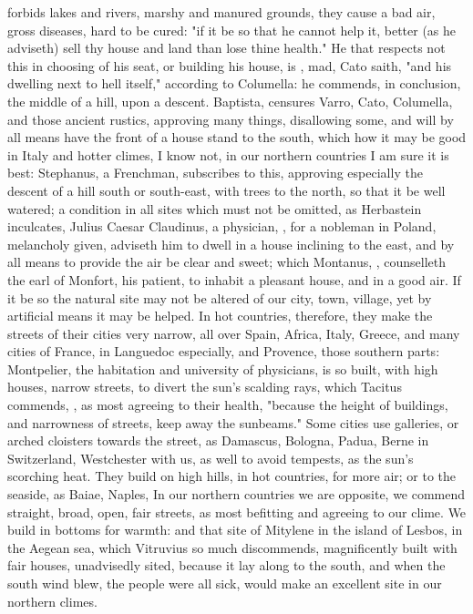 { forbids lakes and rivers, marshy and manured grounds, they cause a bad air, gross diseases, hard to be cured: "if it be so that he cannot help it, better (as he adviseth) sell thy house and land than lose thine health." He that respects not this in choosing of his seat, or building his house, is , mad, Cato saith, "and his dwelling next to hell itself," according to Columella: he commends, in conclusion, the middle of a hill, upon a descent. Baptista,  censures Varro, Cato, Columella, and those ancient rustics, approving many things, disallowing some, and will by all means have the front of a house stand to the south, which how it may be good in Italy and hotter climes, I know not, in our northern countries I am sure it is best: Stephanus, a Frenchman,  subscribes to this, approving especially the descent of a hill south or south-east, with trees to the north, so that it be well watered; a condition in all sites which must not be omitted, as Herbastein inculcates,  Julius Caesar Claudinus, a physician, , for a nobleman in Poland, melancholy given, adviseth him to dwell in a house inclining to the east, and by all means to provide the air be clear and sweet; which Montanus, , counselleth the earl of Monfort, his patient, to inhabit a pleasant house, and in a good air. If it be so the natural site may not be altered of our city, town, village, yet by artificial means it may be helped. In hot countries, therefore, they make the streets of their cities very narrow, all over Spain, Africa, Italy, Greece, and many cities of France, in Languedoc especially, and Provence, those southern parts: Montpelier, the habitation and university of physicians, is so built, with high houses, narrow streets, to divert the sun's scalding rays, which Tacitus commends, , as most agreeing to their health, "because the height of buildings, and narrowness of streets, keep away the sunbeams." Some cities use galleries, or arched cloisters towards the street, as Damascus, Bologna, Padua, Berne in Switzerland, Westchester with us, as well to avoid tempests, as the sun's scorching heat. They build on high hills, in hot countries, for more air; or to the seaside, as Baiae, Naples, \etc{} In our northern countries we are opposite, we commend straight, broad, open, fair streets, as most befitting and agreeing to our clime. We build in bottoms for warmth: and that site of Mitylene in the island of Lesbos, in the Aegean sea, which Vitruvius so much discommends, magnificently built with fair houses,  unadvisedly sited, because it lay along to the south, and when the south wind blew, the people were all sick, would make an excellent site in our northern climes.

}
